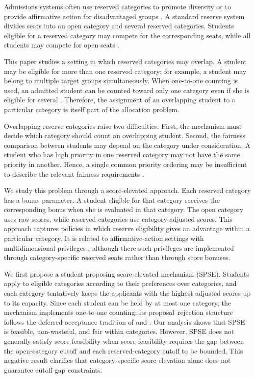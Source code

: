 \documentclass[10pt]{article}
\newcommand{\1}{\mathbf{1}}
\begin{document}
Admissions systems often use reserved categories to promote diversity or to provide affirmative action for disadvantaged groups \citep{Abdu05a,AyTu20a,AyBo21a}. A standard reserve system divides seats into an open category and several reserved categories. Students eligible for a reserved category may compete for the corresponding seats, while all students may compete for open seats \citep{Abdu05a,AyTu23a}.

This paper studies a setting in which reserved categories may overlap. A student may be eligible for more than one reserved category; for example, a student may belong to multiple target groups simultaneously. When one-to-one counting is used, an admitted student can be counted toward only one category even if she is eligible for several \citep{AyBo21a,KHIY17a}. Therefore, the assignment of an overlapping student to a particular category is itself part of the allocation problem.

Overlapping reserve categories raise two difficulties. First, the mechanism must decide which category should count an overlapping student. Second, the fairness comparison between students may depend on the category under consideration. A student who has high priority in one reserved category may not have the same priority in another. Hence, a single common priority ordering may be insufficient to describe the relevant fairness requirements \citep{KHIY17a,GKK+17a}.

We study this problem through a score-elevated approach. Each reserved category has a bonus parameter. A student eligible for that category receives the corresponding bonus when she is evaluated in that category. The open category uses raw scores, while reserved categories use category-adjusted scores. This approach captures policies in which reserve eligibility gives an advantage within a particular category. It is related to affirmative-action settings with multidimensional privileges \citep{AyBo21a}, although there such privileges are implemented through category-specific reserved seats rather than through score bonuses.

We first propose a student-proposing score-elevated mechanism (SPSE). Students apply to eligible categories according to their preferences over categories, and each category tentatively keeps the applicants with the highest adjusted scores up to its capacity. Since each student can be held by at most one category, the mechanism implements one-to-one counting; its proposal--rejection structure follows the deferred-acceptance tradition of \citet{GaSh62a} and \citet{Roth08a}. Our analysis shows that SPSE is feasible, non-wasteful, and fair within categories. However, SPSE does not generally satisfy score-feasibility when score-feasibility requires the gap between the open-category cutoff and each reserved-category cutoff to be bounded. This negative result clarifies that category-specific score elevation alone does not guarantee cutoff-gap constraints.
\end{document}
